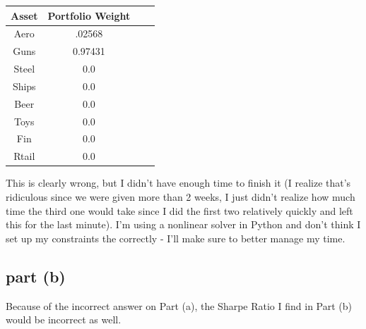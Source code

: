 \documentclass[12pt]{article}
\begin{document}
			\begin{center}
 			\begin{tabular}{||c|c|c|c||} 
 				\hline
 					Asset & Portfolio Weight \\
 				\hline\hline
					Aero & .02568 \\
 				\hline
 					Guns & 0.97431 \\
 				\hline
 					Steel & 0.0 \\
 				\hline
 					Ships & 0.0 \\
				 \hline
				  	Beer & 0.0 \\
				 \hline
				  	Toys & 0.0 \\				 
				  \hline
				  	Fin & 0.0 \\
				  \hline
					Rtail & 0.0 \\
				  \hline
			\end{tabular}
			\end{center}

This is clearly wrong, but I didn't have enough time to finish it (I realize that's ridiculous since we were given more than 2 weeks, I just didn't realize
how much time the third one would take since I did the first two relatively quickly and left this for the last minute).  I'm using a nonlinear solver in Python
and don't think I set up my constraints the correctly - I'll make sure to better manage my time. \newline

	\subsection{part (b)}
	
		Because of the incorrect answer on Part (a), the Sharpe Ratio I find in Part (b) would be incorrect as well. 
\end{document}
